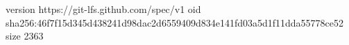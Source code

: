version https://git-lfs.github.com/spec/v1
oid sha256:46f7f15d345d438241d98dac2d6559409d834e141fd03a5d1f11dda55778ce52
size 2363
